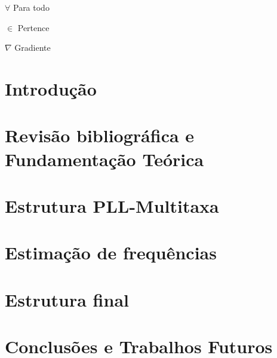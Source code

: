 \documentclass[
12pt,
openany, %
oneside, %
a4paper,			
english,			
brazil			        %
]{abntbibufjf}
\begin{document}
\begin{simbolos} %
	\item[$ \forall $] Para todo
	\item[$ \in $] Pertence
	\item[$ \nabla $] Gradiente
	
\end{simbolos}

\chapter{Introdução}


\chapter{Revisão bibliográfica e Fundamentação Teórica}


\chapter{Estrutura PLL-Multitaxa}


\chapter{Estimação de frequências}


\chapter{Estrutura final}


\chapter{Conclusões e Trabalhos Futuros}

%

\printbibliography
\end{document}
